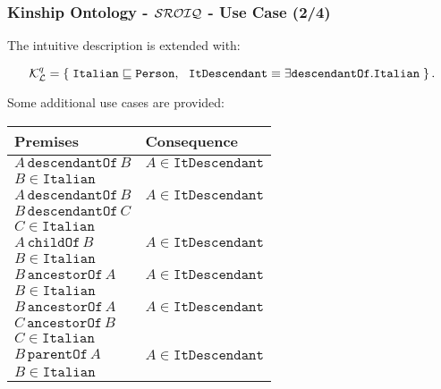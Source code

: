 \documentclass[8pt]{beamer}
\newcommand{\Persons}{\mathtt{Person}}
\newcommand{\child}{\mathtt{childOf}}
\newcommand{\parent}{\mathtt{parentOf}}
\newcommand{\ancestor}{\mathtt{ancestorOf}}
\newcommand{\descendant}{\mathtt{descendantOf}}
\newcommand{\Alice}{A}
\newcommand{\Bob}{B}
\newcommand{\Charlie}{C}
\newcommand{\KBsetsq}{\mathcal{K}^{q}_\mathcal{L}}
\newcommand{\italian}{\mathtt{Italian}}
\newcommand{\withitanc}{\mathtt{ItDescendant}}
\begin{document}
\begin{frame}
\frametitle{Kinship Ontology - $\mathcal{SROIQ}$ - Use Case (2/4)}
The intuitive description is extended with:
\begin{small}
\[
  \KBsetsq = \{\; \italian \Issub \Persons,~~ \withitanc \equiv \exists
  \descendant.\italian \;\} \,.
\]
\end{small}%

Some additional use cases are provided:
\vspace{\baselineskip}

\begin{center}
\begin{small}
\begin{tabular}{|l|l|}
\hline
\bf{Premises} & \bf{Consequence}\\
\hline
  $\Alice\,\descendant\,\Bob$ & $\Alice \in \withitanc$\\
  $\Bob \in \italian$ & \\
\hline
  $\Alice\,\descendant\,\Bob$ & $\Alice \in \withitanc$\\
  $\Bob\,\descendant\,\Charlie$  &\\
  $\Charlie \in \italian$  &\\
\hline
  $\Alice\,\child\,\Bob$ & $\Alice \in \withitanc$\\
  $\Bob \in \italian$  &\\
\hline
  $\Bob\,\ancestor\,\Alice$ & $\Alice \in \withitanc$\\
  $\Bob \in \italian$  &\\
\hline
  $\Bob\,\ancestor\,\Alice$ & $\Alice \in \withitanc$\\
  $\Charlie\,\ancestor\,\Bob$  &\\
  $\Charlie \in \italian$ &\\
\hline
  $\Bob\,\parent\,\Alice$ & $\Alice \in \withitanc$\\
  $\Bob \in \italian$  &\\
\hline
\end{tabular}
\end{small}
\end{center}
\end{frame}
\end{document}

